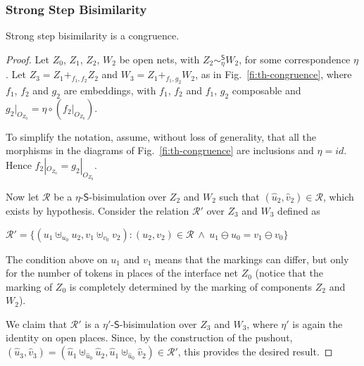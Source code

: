 \documentclass{LMCS}
\newcommand{\init}[1]{\hat{#1}}
\newcommand{\mjoin}{\ensuremath{\uplus}}
\newcommand{\comp}[1]{\ensuremath{+}_{#1}}
\begin{document}
\subsubsection{Strong Step Bisimilarity}


\begin{thm}
  \label{th:congruence-strong-step}
  Strong step bisimilarity is a congruence.
\end{thm}


\begin{proof}
  Let $Z_0$, $Z_1$, $Z_2$, $W_2$ be open nets, with $Z_2
  \sim_\eta^{\mathsf{S}} W_2$, for some correspondence $\eta$.
Let  $Z_3 = Z_1
  \comp{f_1,f_2} Z_2$ and $W_3 = Z_1 \comp{f_1,g_2} W_2$, as in
  Fig.~\ref{fi:th-congruence}, where $f_1$, $f_2$ and $g_2$ are
  embeddings, with $f_1$, $f_2$ and  $f_1$, $g_2$
  composable and $g_2|_{O_{Z_0}} = \eta \circ (f_2|_{O_{Z_0}})$.

  To simplify the notation, assume, without loss of generality, that
  all the morphisms in the diagrams of Fig.~\ref{fi:th-congruence} are
  inclusions and $\eta = id$.  Hence $f_2|_{O_{Z_0}} = g_2|_{O_{Z_0}}$.

  Now let $\mathcal{R}$ be a $\eta$-$\mathsf{S}$-bisimulation over $Z_2$ and
  $W_2$ such that $(\init{u}_2, \init{v}_2) \in \mathcal{R}$, which exists by
  hypothesis.  Consider the relation $\mathcal{R}'$ over $Z_3$ and
  $W_3$ defined as

 \begin{center}
   $\mathcal{R}' = \{ (u_1 \mjoin_{u_0} u_2, v_1 \mjoin_{v_0} v_2) : (u_2, v_2)
   \in \mathcal{R}\ \land\ u_1 \ominus u_0
    = v_1 \ominus v_0 \}$
  \end{center}
The condition above on $u_1$ and $v_1$ means that the markings can
  differ, but only for the number of tokens in places of the interface
  net $Z_0$ (notice that the marking of $Z_0$ is completely determined
  by the marking of components $Z_2$ and $W_2$).

  We claim that $\mathcal{R}'$ is a $\eta'$-$\mathsf{S}$-bisimulation
  over $Z_3$ and $W_3$, where $\eta'$ is again the identity on open
  places.  Since, by the construction of the pushout, $(\init{u}_3,
  \init{v}_3) = (\init{u}_1 \mjoin_{\init{u}_0} \init{u}_2, \init{u}_1
  \mjoin_{\init{u}_0} \init{v}_2) \in \mathcal{R}'$, this provides the
  desired result.

  \medskip


\end{proof}
\end{document}
